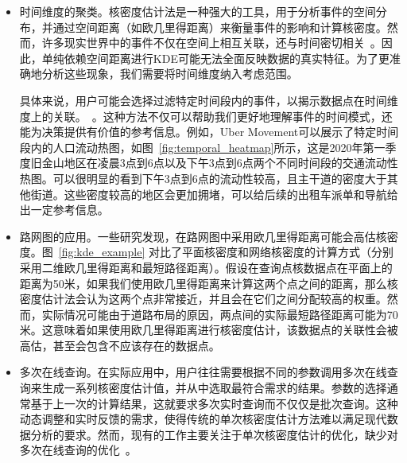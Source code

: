 \begin{itemize}[leftmargin=*]

	\item 时间维度的聚类。核密度估计法是一种强大的工具，用于分析事件的空间分布，并通过空间距离（如欧几里得距离）来衡量事件的影响和计算核密度。然而，许多现实世界中的事件不仅在空间上相互关联，还与时间密切相关~\cite{black_highway_1991}。因此，单纯依赖空间距离进行KDE可能无法全面反映数据的真实特征。为了更准确地分析这些现象，我们需要将时间维度纳入考虑范围。
	
	具体来说，用户可能会选择过滤特定时间段内的事件，以揭示数据点在时间维度上的关联。~\cite{brunsdon_visualising_2007}。这种方法不仅可以帮助我们更好地理解事件的时间模式，还能为决策提供有价值的参考信息。例如，Uber Movement可以展示了特定时间段内的人口流动热图，如图~\ref{fig:temporal_heatmap}所示，这是2020年第一季度旧金山地区在凌晨3点到6点以及下午3点到6点两个不同时间段的交通流动性热图。可以很明显的看到下午3点到6点的流动性较高，且主干道的密度大于其他街道。这些密度较高的地区会更加拥堵，可以给后续的出租车派单和导航给出一定参考信息。
	
	\item 路网图的应用。一些研究发现，在路网图中采用欧几里得距离可能会高估核密度。图~\ref{fig:kde_example} 对比了平面核密度和网络核密度的计算方式（分别采用二维欧几里得距离和最短路径距离）。假设在查询点核数据点在平面上的距离为50米，如果我们使用欧几里得距离来计算这两个点之间的距离，那么核密度估计法会认为这两个点非常接近，并且会在它们之间分配较高的权重。然而，实际情况可能由于道路布局的原因，两点间的实际最短路径距离可能为70米。这意味着如果使用欧几里得距离进行核密度估计，该数据点的关联性会被高估，甚至会包含不应该存在的数据点。

	\item 多次在线查询。在实际应用中，用户往往需要根据不同的参数调用多次在线查询来生成一系列核密度估计值，并从中选取最符合需求的结果。参数的选择通常基于上一次的计算结果，这就要求多次实时查询而不仅仅是批次查询。这种动态调整和实时反馈的需求，使得传统的单次核密度估计方法难以满足现代数据分析的要求。然而，现有的工作主要关注于单次核密度估计的优化，缺少对多次在线查询的优化~\cite{gong_estimating_2014, gan_scalable_2017, plug_spatial_2011, brunsdon_visualising_2007, chan_safe_2021, cristianini_dynamically_1998, gramacki_nonparametric_2018}。
\end{itemize}

